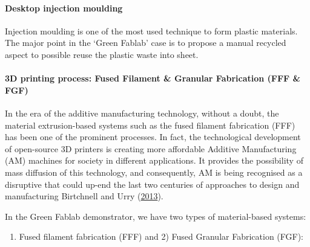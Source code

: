 \documentclass[
  11pt,
]{article}
\let\oldparagraph\paragraph
\renewcommand{\paragraph}[1]{\oldparagraph{#1}\mbox{}}
\providecommand{\tightlist}{%
  \setlength{\itemsep}{0pt}\setlength{\parskip}{0pt}}\usepackage{longtable,booktabs,array}
\let\paragraph\oldparagraph
\begin{document}
\hypertarget{desktop-injection-moulding}{%
\paragraph{Desktop injection
moulding}\label{desktop-injection-moulding}}

Injection moulding is one of the most used technique to form plastic
materials.\\
The major point in the `Green Fablab' case is to propose a manual
recycled aspect to possible reuse the plastic waste into sheet.

\hypertarget{d-printing-process-fused-filament-granular-fabrication-fff-fgf}{%
\paragraph{3D printing process: Fused Filament \& Granular Fabrication
(FFF \&
FGF)}\label{d-printing-process-fused-filament-granular-fabrication-fff-fgf}}

In the era of the additive manufacturing technology, without a doubt,
the material extrusion-based systems such as the fused filament
fabrication (FFF) has been one of the prominent processes. In fact, the
technological development of open-source 3D printers is creating more
affordable Additive Manufacturing (AM) machines for society in different
applications. It provides the possibility of mass diffusion of this
technology, and consequently, AM is being recognised as a disruptive
that could up-end the last two centuries of approaches to design and
manufacturing Birtchnell and Urry
(\protect\hyperlink{ref-Birtchnell2013a}{2013}).

In the Green Fablab demonstrator, we have two types of material-based
systems:

\begin{enumerate}
\def\labelenumi{\arabic{enumi})}
\tightlist
\item
  Fused filament fabrication (FFF) and 2) Fused Granular Fabrication
  (FGF):
\end{enumerate}
\end{document}
